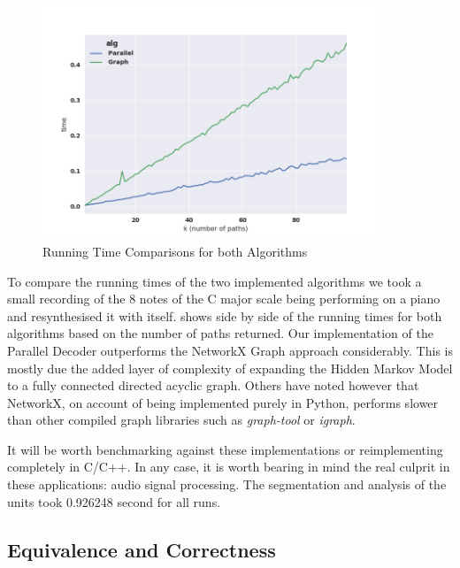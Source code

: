 {{{{{{{{\begin{figure}
	\begin{center}
		\includegraphics[width=0.9\textwidth]{ch05_pyconcat/figures/running_time.png}
	\end{center}
	\caption[Running Time Comparisons for both Algorithms]{Running Time Comparisons for both Algorithms}
	\label{fig:running_times}
\end{figure}

To compare the running times of the two implemented algorithms we took a small recording of the 8 notes of the C major scale being performing on a piano and resynthesised it with itself.  shows side by side of the running times for both algorithms based on the number of paths returned. Our implementation of the Parallel Decoder outperforms the NetworkX Graph approach considerably. This is mostly due the added layer of complexity of expanding the Hidden Markov Model to a fully connected directed acyclic graph. Others have noted however that NetworkX, on account of being implemented purely in Python, performs slower than other compiled graph libraries such as \textit{graph-tool} or \textit{igraph}.

It will be worth benchmarking against these implementations or reimplementing completely in C/C++. In any case, it is worth bearing in mind the real culprit in these applications: audio signal processing. The segmentation and analysis of the units took 0.926248 second for all runs.

\subsection{Equivalence and Correctness}

}}}}}}}}

